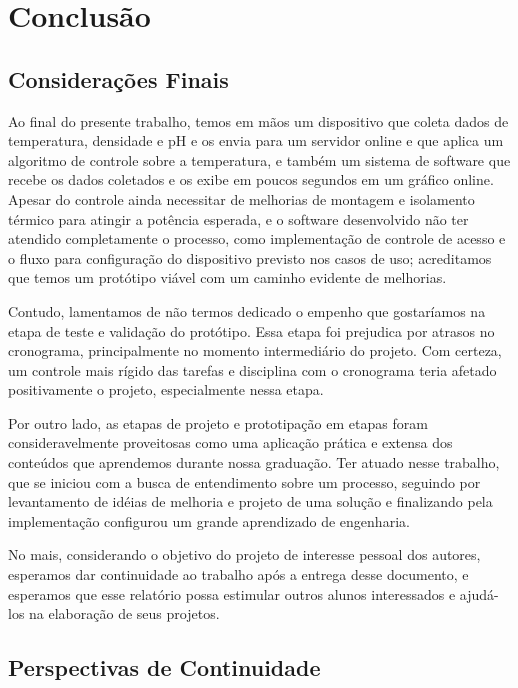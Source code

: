 \chapter{Conclusão}

\section{Considerações Finais}

Ao final do presente trabalho, temos em mãos um dispositivo que coleta dados de temperatura, densidade e pH e os envia 
para um servidor online e que aplica um algoritmo de controle sobre a temperatura, e também um sistema de software 
que recebe os dados coletados e os exibe em poucos segundos em um gráfico online. 
Apesar do controle ainda necessitar de melhorias de montagem e isolamento térmico para atingir a potência esperada, e o 
software desenvolvido não ter atendido completamente o processo, como implementação de controle de acesso e o fluxo para 
configuração do dispositivo previsto nos casos de uso; acreditamos que temos um protótipo viável com um caminho evidente de melhorias.

Contudo, lamentamos de não termos dedicado o empenho que gostaríamos na etapa de teste e validação do protótipo. Essa etapa
foi prejudica por atrasos no cronograma, principalmente no momento intermediário do projeto. Com certeza, um controle mais rígido
das tarefas e disciplina com o cronograma teria afetado positivamente o projeto, especialmente nessa etapa.

Por outro lado, as etapas de projeto e prototipação em etapas foram consideravelmente proveitosas como uma aplicação
prática e extensa dos conteúdos que aprendemos durante nossa graduação. Ter atuado nesse trabalho, que se iniciou com
a busca de entendimento sobre um processo, seguindo por levantamento de idéias de melhoria e projeto de uma solução e 
finalizando pela implementação configurou um grande aprendizado de engenharia.

No mais, considerando o objetivo do projeto de interesse pessoal dos autores, esperamos dar continuidade ao trabalho após
a entrega desse documento, e esperamos que esse relatório possa estimular outros alunos interessados e ajudá-los na 
elaboração de seus projetos.

\section{Perspectivas de Continuidade}

